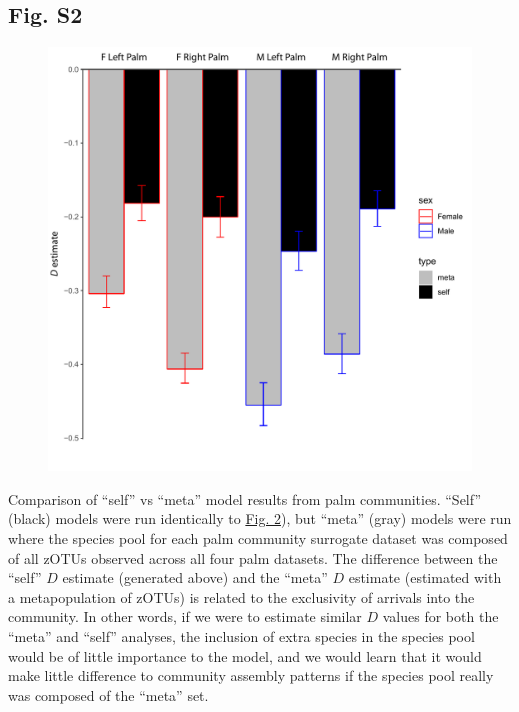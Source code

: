 \documentclass{article}
\begin{document}
{\subsection{Fig. S2}\label{sec:figureS2}
\begin{figure}[ht]
	\centering
	\includegraphics[scale=0.80]{figs/Fig_S2.pdf}
\end{figure}
Comparison of “self” vs “meta” model results from palm communities. “Self” (black) models were run identically to \hyperref[sec:figure2]{Fig. 2}), but “meta” (gray) models were run where the species pool for each palm community surrogate dataset was composed of all zOTUs observed across all four palm datasets. The difference between the “self” \(D\) estimate (generated above) and the “meta” \(D\) estimate (estimated with a metapopulation of zOTUs) is related to the exclusivity of arrivals into the community. In other words, if we were to estimate similar \(D\) values for both the “meta” and “self” analyses, the inclusion of extra species in the species pool would be of little importance to the model, and we would learn that it would make little difference to community assembly patterns if the species pool really was composed of the “meta” set.
\newpage

}
\end{document}
